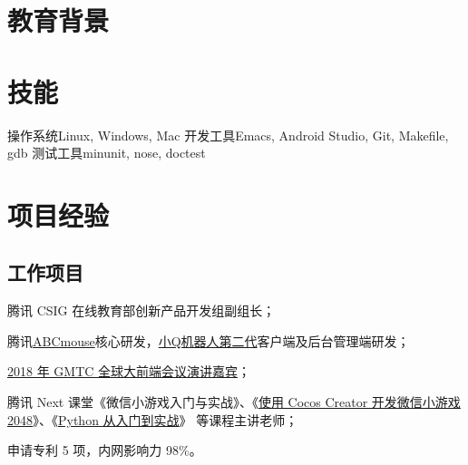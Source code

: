 
\section{\hei 教育背景}



\section{\hei 技能}

           {操作系统}{Linux, Windows, Mac}
           {开发工具}{Emacs, Android Studio, Git, Makefile, gdb}
           {测试工具}{minunit, nose, doctest}

\section{\hei 项目经验}


\subsection{\hei 工作项目}

{
  \begin{tightitemize}%
  \item 腾讯 CSIG 在线教育部创新产品开发组副组长；
  \item 腾讯\href{https://abcmouse.qq.com}{ABCmouse}核心研发，\href{https://qrobot.qq.com/}{小Q机器人第二代}客户端及后台管理端研发；
  \item \href{https://www.infoq.cn/article/QXiWs69g24PMk0ldg1to}{2018 年 GMTC 全球大前端会议演讲嘉宾}；
  \item 腾讯 Next 课堂《微信小游戏入门与实战》、《\href{https://ke.qq.com/course/350627?from=800004380}{使用 Cocos Creator 开发微信小游戏 2048}》、《\href{https://ke.qq.com/course/384790?tuin=1b8113f4}{Python 从入门到实战}》 等课程主讲老师；
  \item 申请专利 5 项，内网影响力 98\%。
  \end{tightitemize}}

